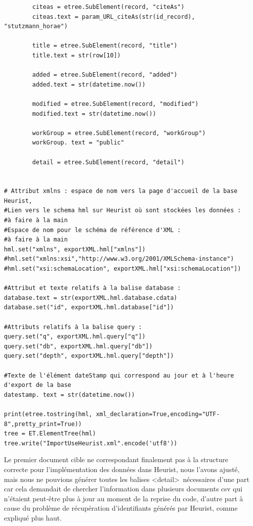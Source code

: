 \documentclass[a4paper,12pt,twoside]{book}
\begin{document}
\begin{verbatim}
        citeas = etree.SubElement(record, "citeAs")       
        citeas.text = param_URL_citeAs(str(id_record), "stutzmann_horae")
        
        title = etree.SubElement(record, "title")
        title.text = str(row[10])

        added = etree.SubElement(record, "added")
        added.text = str(datetime.now())

        modified = etree.SubElement(record, "modified")
        modified.text = str(datetime.now())

        workGroup = etree.SubElement(record, "workGroup")
        workGroup. text = "public"

        detail = etree.SubElement(record, "detail")


# Attribut xmlns : espace de nom vers la page d'accueil de la base Heurist,
#Lien vers le schema hml sur Heurist où sont stockées les données : 
#à faire à la main
#Espace de nom pour le schéma de référence d'XML :
#à faire à la main
hml.set("xmlns", exportXML.hml["xmlns"])
#hml.set("xmlns:xsi","http://www.w3.org/2001/XMLSchema-instance")
#hml.set("xsi:schemaLocation", exportXML.hml["xsi:schemaLocation"])

#Attribut et texte relatifs à la balise database :
database.text = str(exportXML.hml.database.cdata)
database.set("id", exportXML.hml.database["id"])

#Attributs relatifs à la balise query :
query.set("q", exportXML.hml.query["q"])
query.set("db", exportXML.hml.query["db"])
query.set("depth", exportXML.hml.query["depth"])

#Texte de l'élément dateStamp qui correspond au jour et à l'heure 
d'export de la base
datestamp. text = str(datetime.now())

print(etree.tostring(hml, xml_declaration=True,encoding="UTF-8",pretty_print=True))
tree = ET.ElementTree(hml)
tree.write("ImportUseHeurist.xml".encode('utf8'))
	\end{verbatim}
	
Le premier document cible ne correspondant finalement pas à la structure correcte pour l'implémentation des données dans Heurist, nous l'avons ajusté, mais nous ne pouvions générer toutes les balises \textless detail\textgreater~nécessaires d'une part car cela demandait de chercher l'information dans plusieurs documents csv qui n'étaient peut-être plus à jour au moment de la reprise du code, d'autre part à cause du problème de récupération d'identifiants générés par Heurist, comme expliqué plus haut.
\end{document}
